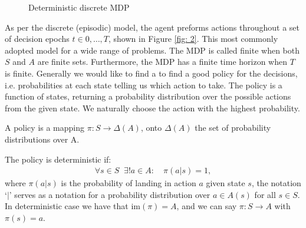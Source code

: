 \begin{figure}[H]
    \centering
    \caption{Deterministic discrete MDP \label{fig: 2} \cite{ml_foundations}}
    \label{}
\end{figure}
As per the discrete (episodic) model, the agent preforms actions throughout a
set of decision epochs $t \in {0,\ldots,T}$, shown in Figure \ref{fig: 2}.
This most commonly adopted model for a wide range of problems. The MDP is
called finite when both $S$ and $A$ are finite sets. Furthermore, the MDP has
a finite time horizon when $T$ is finite.
\newline
Generally we would like to find a to find a good policy for the decisions,
i.e. probabilities at each state telling us which action to take. The policy
is a function of states, returning a probability distribution over the
possible actions from the given state. We naturally choose the action with
the highest probability.
\begin{definition}[Policy]
    A policy is a mapping $\pi : S \to \Delta\left( A \right)$, onto
    $\Delta(A)$ the set of probability distributions over A.

    The policy is deterministic if:
    \begin{align}
        \forall s \in S\;\; \exists !  a\in A:\quad \pi(a|s) = 1,
    \end{align}
    where $\pi(a|s)$ is the probability of landing in action $a$ given state
    $s$, the notation `$|$' serves as a notation for a probability
    distribution over $a \in A(s)$ for all $s \in S$. In deterministic case
    we have that $\text{im}(\pi) = A$, and we can say $\pi: S \to A$ with
    $\pi(s) = a$.
\end{definition}
